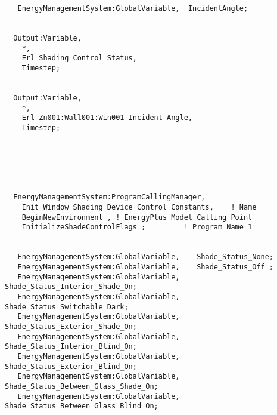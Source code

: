 \begin{lstlisting}
   EnergyManagementSystem:GlobalVariable,  IncidentAngle;


  Output:Variable,
    *,
    Erl Shading Control Status,
    Timestep;


  Output:Variable,
    *,
    Erl Zn001:Wall001:Win001 Incident Angle,
    Timestep;






  EnergyManagementSystem:ProgramCallingManager,
    Init Window Shading Device Control Constants,    ! Name
    BeginNewEnvironment , ! EnergyPlus Model Calling Point
    InitializeShadeControlFlags ;         ! Program Name 1


   EnergyManagementSystem:GlobalVariable,    Shade_Status_None;
   EnergyManagementSystem:GlobalVariable,    Shade_Status_Off ;
   EnergyManagementSystem:GlobalVariable,    Shade_Status_Interior_Shade_On;
   EnergyManagementSystem:GlobalVariable,    Shade_Status_Switchable_Dark;
   EnergyManagementSystem:GlobalVariable,    Shade_Status_Exterior_Shade_On;
   EnergyManagementSystem:GlobalVariable,    Shade_Status_Interior_Blind_On;
   EnergyManagementSystem:GlobalVariable,    Shade_Status_Exterior_Blind_On;
   EnergyManagementSystem:GlobalVariable,    Shade_Status_Between_Glass_Shade_On;
   EnergyManagementSystem:GlobalVariable,    Shade_Status_Between_Glass_Blind_On;





\end{lstlisting}

